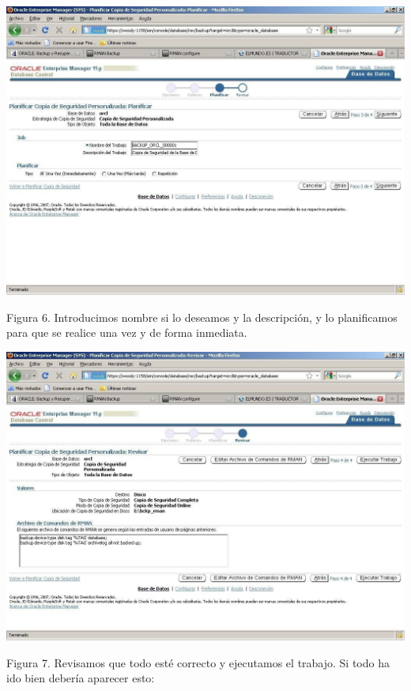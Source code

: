 \documentclass[a4paper,openright,12pt]{book}
\begin{document}
\begin{center}
\includegraphics[width=15cm]{./images/backup/5.jpg}
\end{center}
Figura 6. Introducimos nombre si lo deseamos y la descripción, y lo planificamos para que se realice una vez y de forma inmediata.
\begin{center}
\includegraphics[width=15cm]{./images/backup/6.jpg}
\end{center}
Figura 7. Revisamos que todo esté correcto y ejecutamos el trabajo. Si todo ha ido bien debería aparecer esto:
\end{document}
